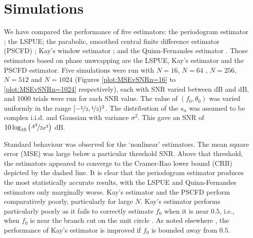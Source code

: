 \documentclass[journal]{IEEEtran}
\begin{document}












\section{Simulations} \label{sec:simulations} 

We have compared the performance of five 
estimators: the periodogram estimator
\cite{Rife1974}; the LSPUE; the parabolic, smoothed central finite difference
estimator (PSCFD) \cite{Lovell1991}; Kay's window estimator \cite{Kay1989};
and the Quinn-Fernandes estimator \cite{Quinn_Fernandes_1991,
  Quinn_recent_advances_in_freq_est_2008}.  Those estimators based on phase
unwrapping are the LSPUE, Kay's estimator and the PSCFD estimator. Five
simulations were run with $N=16$, $N=64$ , $N=256$, $N=512$ and $N=1024$ (Figures \ref{plot:MSEvSNRn=16} to \ref{plot:MSEvSNRn=1024} respectively), each with SNR  varied between \unit[-20]{dB} and \unit[20]{dB},  and 1000 trials were run for each SNR value.  The value of $(f_0, \theta_0)$ was varied uniformly
in the range $[-\nicefrac{1}{2},\nicefrac{1}{2})^2$.  The distribution of the
$s_n$ was assumed to be complex i.i.d. and Gaussian with variance $\sigma^2$. 
This gave an SNR of $10 \log_{10} \left( \nicefrac{A^2}{2\sigma^2} \right)$ dB.

Standard behaviour was observed for the `nonlinear' estimators.  The mean
square error (MSE) was large below a particular threshold SNR.  Above that
threshold, the estimators appeared to converge to the Cramer-Rao lower bound
(CRB) \cite{Rife1974} depicted by the dashed line.  It is clear that the
periodogram estimator produces the most statistically accurate results, with
the LSPUE and Quinn-Fernandes estimators only marginally worse.  Kay's
estimator and the PSCFD perform comparatively poorly, particularly for large
$N$.  Kay's estimator performs particularly poorly as it fails to correctly
estimate $f_0$ when it is near $0.5$, i.e., when $f_0$ is near the branch cut
on the unit circle \cite{Clarkson1999}.  As noted elsewhere
\cite{Clarkson1994AnalysisKaysVariance}, the performance of Kay's estimator is
improved if $f_0$ is bounded away from $0.5$.
\end{document}
